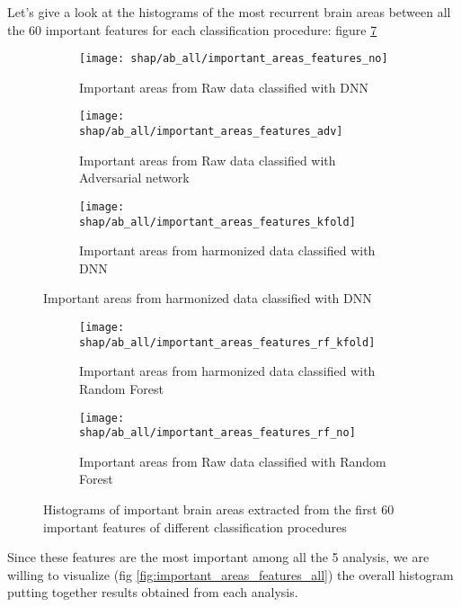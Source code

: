 \documentclass[11pt]{report}
\begin{document}
Let's give a look at the histograms of the most recurrent brain areas between all the 60 important features for each classification procedure: figure \ref{fig:histograms_60}

\begin{figure}
\centering
\begin{subfigure}[b]{1\columnwidth}
   \texttt{[image: shap/ab\_all/important\_areas\_features\_no]}
   \caption{Important areas from Raw data classified with DNN}
   \label{}
\end{subfigure}

\begin{subfigure}[b]{1\columnwidth}
   \texttt{[image: shap/ab\_all/important\_areas\_features\_adv]}
   \caption{Important areas from Raw data classified with Adversarial network}
   \label{}
\end{subfigure}

\begin{subfigure}[b]{1\columnwidth}
   \texttt{[image: shap/ab\_all/important\_areas\_features\_kfold]}
   \caption{Important areas from harmonized data classified with DNN}
   \label{}
\end{subfigure}
\end{figure}
\begin{figure}\ContinuedFloat
\begin{subfigure}[b]{1\columnwidth}
   \texttt{[image: shap/ab\_all/important\_areas\_features\_rf\_kfold]}
   \caption{Important areas from harmonized data classified with Random Forest}
   \label{}
\end{subfigure}

\begin{subfigure}[b]{1\columnwidth}
   \texttt{[image: shap/ab\_all/important\_areas\_features\_rf\_no]}
   \caption{Important areas from Raw data classified with Random Forest}
   \label{}
\end{subfigure}
\caption{Histograms of important brain areas extracted from the first 60 important features of different classification procedures}
\label{fig:histograms_60}
\end{figure}


Since these features are the most important among all the 5 analysis, we are willing to visualize (fig \ref{fig:important_areas_features_all}) the overall histogram putting together results obtained from each analysis.
\end{document}
